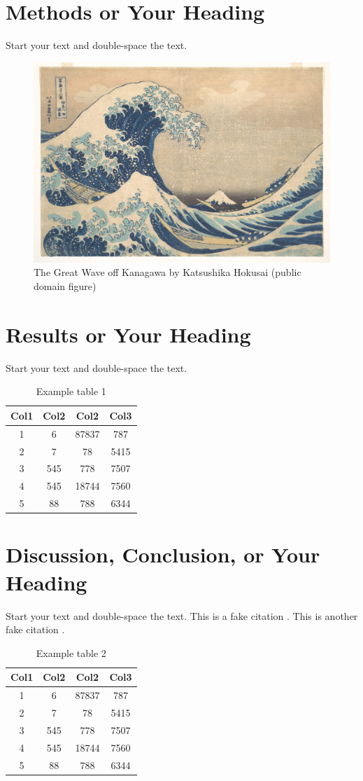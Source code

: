 \documentclass[debug, font=Times]{gw-dissertation}[2021/11/19]
\begin{document}
\chapter{Methods or Your Heading}

Start your text and double-space the text.
\begin{figure}[h!]
    \centering
    \includegraphics[width=0.5\linewidth]{the_great_wave.jpg}
    \caption{The Great Wave off Kanagawa by Katsushika Hokusai (public domain figure)}
\end{figure}

\chapter{Results or Your Heading}

Start your text and double-space the text.
\begin{table}[h!]
    \centering
    \begin{tabular}{||c c c c||}
         \hline
         Col1 & Col2 & Col2 & Col3 \\ [0.5ex]
         \hline\hline
         1 & 6 & 87837 & 787 \\
         2 & 7 & 78 & 5415 \\
         3 & 545 & 778 & 7507 \\
         4 & 545 & 18744 & 7560 \\
         5 & 88 & 788 & 6344 \\ [1ex]
         \hline
    \end{tabular}
    \caption{Example table 1}
\end{table}

\chapter{Discussion, Conclusion, or Your Heading}

Start your text and double-space the text. This is a fake citation \cite{author1_1990}. This is
another fake citation \cite{author2_2000}.
\begin{table}[h!]
    \centering
    \begin{tabular}{||c c c c||}
         \hline
         Col1 & Col2 & Col2 & Col3 \\ [0.5ex]
         \hline\hline
         1 & 6 & 87837 & 787 \\
         2 & 7 & 78 & 5415 \\
         3 & 545 & 778 & 7507 \\
         4 & 545 & 18744 & 7560 \\
         5 & 88 & 788 & 6344 \\ [1ex]
         \hline
    \end{tabular}
    \caption{Example table 2}
\end{table}
\end{document}
